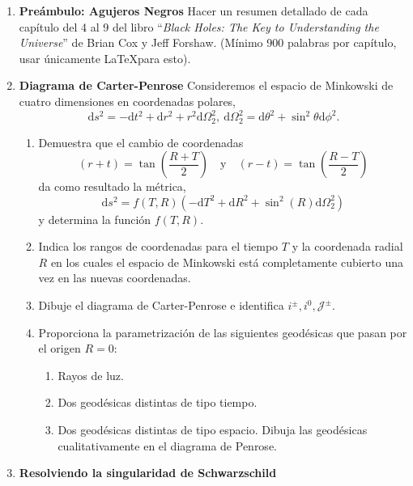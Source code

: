 \documentclass[../main]{subfiles}
\begin{document}
\begin{adjustwidth}{0pt}{-100pt}
\begin{enumerate}
\begin{enumerate}[label=(\alph*)]
    \end{enumerate}
    \item \textbf{Preámbulo: Agujeros Negros}
    Hacer un resumen detallado de cada capítulo del 4 al 9 del libro ``\textit{Black Holes: The Key to Understanding the Universe}'' de Brian Cox y Jeff Forshaw. (Mínimo 900 palabras por capítulo, usar únicamente \LaTeX para esto).
    \item \textbf{Diagrama de Carter-Penrose}
    Consideremos el espacio de Minkowski de cuatro dimensiones en coordenadas polares,
    \begin{equation}
        \mathrm{d}s^2=-\mathrm{d}t^2+\mathrm{d}r^2+r^2\mathrm{d}\Omega^2_2,\ \mathrm{d}\Omega^2_2=\mathrm{d}\theta^2+\sin^2 \theta \mathrm{d}\phi^2.
    \end{equation}
    \begin{enumerate}[label=(\alph*)]
        \item Demuestra que el cambio de coordenadas 
        \begin{equation}
            (r+t)=\tan\left(\dfrac{R+T}{2}\right) \quad \text{y} \quad (r-t)=\tan\left(\dfrac{R-T}{2}\right)
        \end{equation}
        da como resultado la métrica,
        \begin{equation}
            \mathrm{d}s^2=f(T, R)(-\mathrm{d}T^2+\mathrm{d}R^2+\sin^2(R)\mathrm{d}\Omega^2_2)
        \end{equation}
        y determina la función $f(T, R)$.
        \item Indica los rangos de coordenadas para el tiempo $T$ y la coordenada radial $R$ en los cuales el espacio de Minkowski está completamente cubierto una vez en las nuevas coordenadas.
        \item Dibuje el diagrama de Carter-Penrose e identifica $i^{\pm}, i^0, \mathcal{J}^{\pm}$. 
        \item Proporciona la parametrización de las siguientes geodésicas que pasan por el origen $R=0$:
        \begin{enumerate}
            \item Rayos de luz.
            \item Dos geodésicas distintas de tipo tiempo.
            \item Dos geodésicas distintas de tipo espacio. Dibuja las geodésicas cualitativamente en el diagrama de Penrose.
        \end{enumerate}
    \end{enumerate}
    \item \textbf{Resolviendo la singularidad de Schwarzschild}

\end{enumerate}
\end{adjustwidth}
\end{document}

